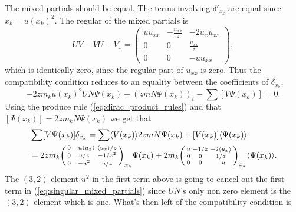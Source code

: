 \documentclass[english,master]{liumaiex}
\theoremstyle{plain}
\theoremstyle{definition}
\begin{document}
The mixed partials should be equal. The terms involving $\delta'_{x_k}$ are equal since $\dot{x}_k = u(x_k)^2$. The regular of the mixed partials is
\begin{equation}
	UV - VU - V_x =
	\begin{pmatrix}
		u u_{xx} & -\frac{u_{xx}}{z} & -2 u_x u_{xx} \\
		0 & 0 & \frac{u_{xx}}{z} \\
		0 & 0 & -u u_{xx}
	\end{pmatrix},
\end{equation}
which is identically zero, since the regular part of $u_{xx}$ is zero. Thus the compatibility condition reduces to an equality between the coefficients of $\delta_{x_k}$,
\begin{equation} \label{eq:singular_mixed_partials}
	-2zm_ku(x_k)^2UN\Psi(x_k) + (zmN \Psi(x_k))_t - \sum [V \Psi(x_k)] = 0.
\end{equation}
Using the produce rule (\ref{eq:dirac_product_rules}) and that $[\Psi(x_k)] = 2zm_kN\Psi(x_k)$ we get that
\begin{equation}
\begin{aligned}
	&\sum [V \Psi(x_k)] \delta_{x_k} 
	= \sum \langle V(x_k) \rangle 2zmN\Psi(x_k) + [V(x_k)]\langle \Psi(x_k) \rangle \\
	&= 2zm_k
	\begin{psmallmatrix}
		0 & -u\langle u_x \rangle & \langle u_x \rangle/z \\
		0 & u/z & -1/z^2 \\
		0 & -u^2 & u/z \\
	\end{psmallmatrix}_{x_k} \Psi(x_k)
	+2m_k
	\begin{psmallmatrix}
		u & -1/z & -2\langle u_x \rangle \\
		0 & 0 & 1/z \\
		0 & 0 & -u \\
	\end{psmallmatrix}_{x_k} \langle \Psi(x_k) \rangle.
\end{aligned}
\end{equation}
The $(3,2)$ element $u^2$ in the first term above is going to cancel out the first term in (\ref{eq:singular_mixed_partials}) since $UN$'s only non zero element is the $(3,2)$ element which is one. What's then left of the compatibility condition is
\end{document}
